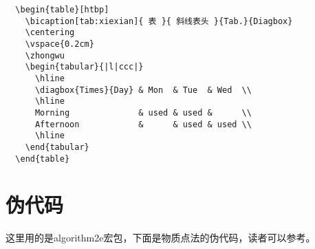 \begin{lstlisting}
  \begin{table}[htbp]
    \bicaption[tab:xiexian]{ 表 }{ 斜线表头 }{Tab.}{Diagbox}
    \centering
    \vspace{0.2cm}
    \zhongwu
    \begin{tabular}{|l|ccc|}
      \hline
      \diagbox{Times}{Day} & Mon  & Tue  & Wed  \\
      \hline
      Morning              & used & used &      \\
      Afternoon            &      & used & used \\
      \hline
    \end{tabular}
  \end{table}
\end{lstlisting}

\section{伪代码}

这里用的是algorithm2e宏包，下面是物质点法的伪代码，读者可以参考。

